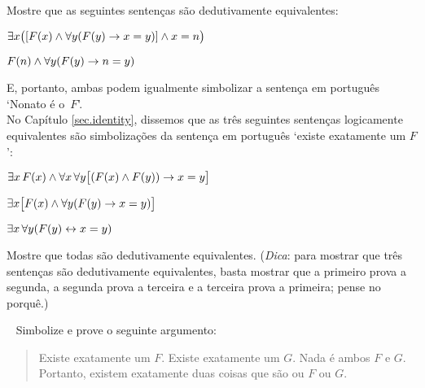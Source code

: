 \problempart
Mostre que as seguintes senten\c cas s\~ao dedutivamente equivalentes:
\begin{ebullet}
\item $\exists x \bigl([\mathord{F}(x) \wedge \forall y (\mathord{F}(y) \rightarrow x = y)] \wedge x = n\bigr)$
\item $\mathord{F}(n) \wedge \forall y (\mathord{F}(y) \rightarrow n= y)$
\end{ebullet}
E, portanto, ambas podem igualmente simbolizar a senten\c ca em portugu\^es `Nonato \'e o~$F$'.\\

\problempart
No Capítulo   \ref{sec.identity}, dissemos que as tr\^es seguintes senten\c cas logicamente equivalentes  s\~ao simboliza\c c\~oes da senten\c ca em portugu\^es `existe exatamente um $F$':
\begin{ebullet}
\item $\exists x\,\mathord{F}(x) \wedge \forall x\, \forall y \bigl[(\mathord{F}(x) \wedge \mathord{F}(y)) \rightarrow x = y\bigr]$
\item $\exists x \bigl[\mathord{F}(x) \wedge \forall y (\mathord{F}(y) \rightarrow x = y)\bigr]$
\item $\exists x\, \forall y (\mathord{F}(y) \leftrightarrow x = y)$
\end{ebullet}
Mostre que todas s\~ao dedutivamente equivalentes. (\emph{Dica}: para mostrar que tr\^es senten\c cas s\~ao dedutivamente equivalentes, basta mostrar que a  primeiro  prova a segunda, a segunda prova a terceira e a terceira prova a primeira; pense no porqu\^e.)

\
\problempart
Simbolize e prove o seguinte argumento:
	\begin{quote}
		Existe exatamente um $F$. Existe exatamente um $G$. Nada \'e ambos $F$ e $G$. Portanto, existem exatamente duas coisas que  s\~ao ou $F$ ou $G$.
	\end{quote}
 



